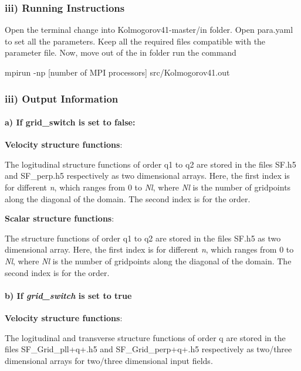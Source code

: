 \subsubsection*{iii) Running Instructions}

Open the terminal change into {\ttfamily Kolmogorov41-\/master/in} folder. Open {\ttfamily para.\-yaml} to set all the parameters. Keep all the required files compatible with the parameter file. Now, move out of the {\ttfamily in} folder run the command

{\ttfamily mpirun -\/np \mbox{[}number of M\-P\-I processors\mbox{]} src/\-Kolmogorov41.\-out}

\subsubsection*{iii) Output Information}

\paragraph*{a) If {\ttfamily grid\-\_\-switch} is set to {\ttfamily false}\-:}

{\bfseries Velocity structure functions}\-:

The logitudinal structure functions of order {\ttfamily q1} to {\ttfamily q2} are stored in the files {\ttfamily S\-F.\-h5} and {\ttfamily S\-F\-\_\-perp.\-h5} respectively as two dimensional arrays. Here, the first index is for different {\itshape n}, which ranges from 0 to {\itshape Nl}, where {\itshape Nl} is the number of gridpoints along the diagonal of the domain. The second index is for the order.

{\bfseries Scalar structure functions}\-:

The structure functions of order {\ttfamily q1} to {\ttfamily q2} are stored in the files {\ttfamily S\-F.\-h5} as two dimensional array. Here, the first index is for different {\itshape n}, which ranges from 0 to {\itshape Nl}, where {\itshape Nl} is the number of gridpoints along the diagonal of the domain. The second index is for the order.

\paragraph*{b) If {\itshape grid\-\_\-switch} is set to {\ttfamily true}}

{\bfseries Velocity structure functions}\-:

The logitudinal and transverse structure functions of order {\ttfamily q} are stored in the files {\ttfamily S\-F\-\_\-\-Grid\-\_\-pll}+{\ttfamily q}+{\ttfamily .h5} and {\ttfamily S\-F\-\_\-\-Grid\-\_\-perp}+{\ttfamily q}+{\ttfamily .h5} respectively as two/three dimensional arrays for two/three dimensional input fields.


